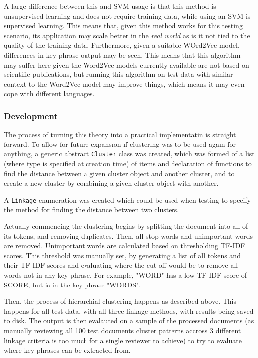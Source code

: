 A large difference between this and SVM usage is that this method is unsupervised learning and does not require training data, while using an SVM is supervised learning. This means that, given this method works for this testing scenario, its application may scale better in the \textit{real world} as is it not tied to the quality of the training data. Furthermore, given a suitable WOrd2Vec model, differences in key phrase output may be seen. This means that this algorithm may suffer here given the Word2Vec models currently available are not based on scientific publications, but running this algorithm on test data with similar context to the Word2Vec model may improve things, which means it may even cope with different languages.

\subsubsection*{Development}
The process of turning this theory into a practical implementatin is straight forward. To allow for future expansion if clustering was to be used again for anything, a generic abstract \texttt{Cluster} class was created, which was formed of a list (where type is specified at creation time) of items and declaration of functions to find the distance between a given cluster object and another cluster, and to create a new cluster by combining a given cluster object with another.

A \texttt{Linkage} enumeration was created which could be used when testing to specify the method for finding the distance between two clusters.

Actually commencing the clustering begins by splitting the document into all of its tokens, and removing duplicates. Then, all stop words and unimportant words are removed. Unimportant words are calculated based on thresholding TF-IDF scores. This threshold was manually set, by generating a list of all tokens and their TF-IDF scores and evaluating where the cut off would be to remove all words not in any key phrase. For example, "WORD" has a low TF-IDF score of SCORE, but is in the key phrase "WORDS".


Then, the process of hierarchial clustering happens as described above. This happens for all test data, with all three linkage methods, with results being saved to disk. The output is then evalauted on a sample of the processed documents (as manually reviewing all 100 test documents cluster patterns accross 3 different linkage criteria is too much for a single reviewer to achieve) to try to evaluate where key phrases can be extracted from.

